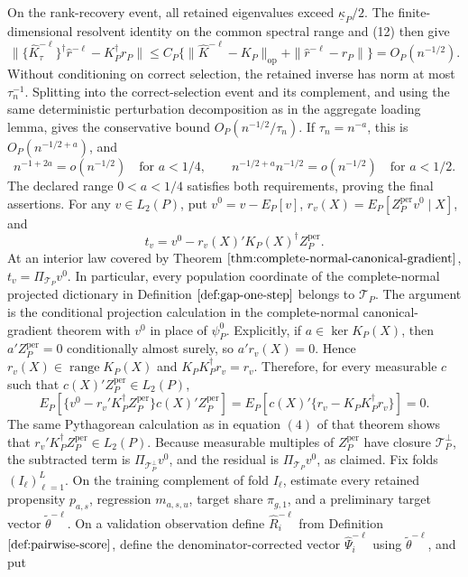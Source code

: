 On the rank-recovery event, all retained eigenvalues exceed \(\underline\kappa_P/2\).  The finite-dimensional resolvent identity on the common spectral range and (12) then give
\[
\|\{\widehat K^{-\ell}_\tau\}^\dagger\widehat r^{-\ell}-K_P^\dagger r_P\|
\le C_P\{\|\widehat K^{-\ell}-K_P\|_{\mathrm{op}}
+\|\widehat r^{-\ell}-r_P\|\}=O_P(n^{-1/2}).
\tag{14}
\]
Without conditioning on correct selection, the retained inverse has norm at most \(\tau_n^{-1}\).  Splitting into the correct-selection event and its complement, and using the same deterministic perturbation decomposition as in the aggregate loading lemma, gives the conservative bound \(O_P(n^{-1/2}/\tau_n)\).  If \(\tau_n=n^{-a}\), this is \(O_P(n^{-1/2+a})\), and
\[
n^{-1+2a}=o(n^{-1/2})\quad\text{for }a<1/4,
\qquad
n^{-1/2+a}n^{-1/2}=o(n^{-1/2})\quad\text{for }a<1/2.
\]
The declared range \(0<a<1/4\) satisfies both requirements, proving the final assertions.
For any \(v\in L_2(P)\), put \(v^0=v-E_P[v]\), \(r_v(X)=E_P[Z_P^{\mathrm{per}}v^0\mid X]\), and
\[
t_v=v^0-r_v(X)'K_P(X)^\dagger Z_P^{\mathrm{per}}.
\]
At an interior law covered by Theorem \(\ref{thm:complete-normal-canonical-gradient}\), \(t_v=\Pi_{\mathcal T_P}v^0\).  In particular, every population coordinate of the complete-normal projected dictionary in Definition \(\ref{def:gap-one-step}\) belongs to \(\mathcal T_P\).
The argument is the conditional projection calculation in the complete-normal canonical-gradient theorem with \(v^0\) in place of \(\psi_P^0\).  Explicitly, if \(a\in\ker K_P(X)\), then \(a'Z_P^{\mathrm{per}}=0\) conditionally almost surely, so \(a'r_v(X)=0\).  Hence \(r_v(X)\in\operatorname{range}K_P(X)\) and \(K_PK_P^\dagger r_v=r_v\).  Therefore, for every measurable \(c\) such that \(c(X)'Z_P^{\mathrm{per}}\in L_2(P)\),
\[
E_P\!\left[\{v^0-r_v'K_P^\dagger Z_P^{\mathrm{per}}\}
c(X)'Z_P^{\mathrm{per}}\right]
=E_P[c(X)'\{r_v-K_PK_P^\dagger r_v\}]=0.
\]
The same Pythagorean calculation as in equation \((4)\) of that theorem shows that \(r_v'K_P^\dagger Z_P^{\mathrm{per}}\in L_2(P)\).  Because measurable multiples of \(Z_P^{\mathrm{per}}\) have closure \(\mathcal T_P^\perp\), the subtracted term is \(\Pi_{\mathcal T_P^\perp}v^0\), and the residual is \(\Pi_{\mathcal T_P}v^0\), as claimed.
Fix folds \((I_\ell)_{\ell=1}^L\).  On the training complement of fold \(I_\ell\), estimate every retained propensity \(p_{a,s}\), regression \(m_{a,s,u}\), target share \(\pi_{g,1}\), and a preliminary target vector \(\widetilde\theta^{-\ell}\).  On a validation observation define \(\widehat R_i^{-\ell}\) from Definition \(\ref{def:pairwise-score}\), define the denominator-corrected vector \(\widehat\Psi_i^{-\ell}\) using \(\widetilde\theta^{-\ell}\), and put
